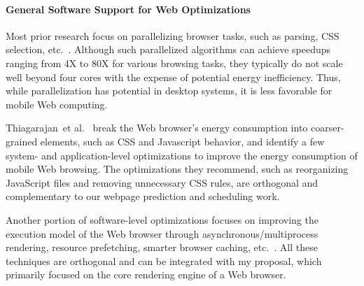 \paragraph{General Software Support for Web Optimizations} Most prior research focus on parallelizing browser tasks, such as parsing, CSS selection, etc.~\cite{ParallelBrowser, FTL, UCI, Parabix}. Although such parallelized algorithms can achieve speedups ranging from 4X to 80X for various browsing tasks, they typically do not scale well beyond four cores with the expense of potential energy inefficiency. Thus, while parallelization has potential in desktop systems, it is less favorable for mobile Web computing.

Thiagarajan~et al.~\cite{www-battery} break the Web browser's energy consumption into coarser-grained elements, such as CSS and Javascript behavior, and identify a few system- and application-level optimizations to improve the energy consumption of mobile Web browsing.  The optimizations they recommend, such as reorganizing JavaScript files and removing unnecessary CSS rules, are orthogonal and complementary to our webpage prediction and scheduling work.

Another portion of software-level optimizations focuses on improving the execution model of the Web browser through asynchronous/multiprocess rendering, resource prefetching, smarter browser caching, etc.~\cite{pocketweb, Adrenaline, smart-caching, webkit2, firefox-spec_parsing}. All these techniques are orthogonal and can be integrated with my proposal, which primarily focused on the core rendering engine of a Web browser.

